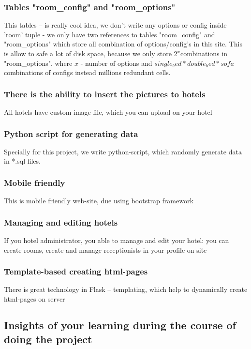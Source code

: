 \documentclass{sig-alternate-05-2015}
\begin{document}
\subsubsection{Tables "room\_config" and "room\_options"}
This tables -- is really cool idea, we don't write any options or config inside 'room' tuple - we only have two references to tables "room\_config" and "room\_options" which store all combination of options/config's in this site. This is allow to safe a lot of disk space, because we only store $ 2^x $combinations in "room\_options", where $x$ - number of options and $ single_bed*double_bed*sofa $ combinations of configs instead millions redundant cells.

\subsubsection{There is the ability to insert the pictures to hotels}
All hotels have custom image file, which you can upload on your hotel

\subsubsection{Python script for generating data}
Specially for this project, we write python-script, which randomly generate data in *.sql files.

\subsubsection{Mobile friendly}
This is mobile friendly web-site, due using bootstrap framework

\subsubsection{Managing and editing hotels}
If you hotel administrator, you able to manage and edit your hotel: you can create rooms, create and manage receptionists in your profile on site

\subsubsection{Template-based creating html-pages}
There is great technology in Flask -- templating, which help to dynamically create html-pages on server


\subsection{Insights of your learning during the course of doing the project}
\end{document}
